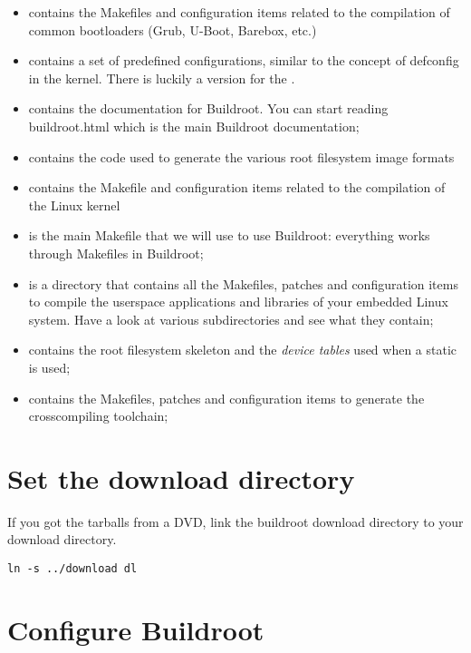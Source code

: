 \begin{itemize}
\item {} contains the Makefiles and configuration items
  related to the compilation of common bootloaders (Grub, U-Boot,
  Barebox, etc.)
\item {} contains a set of predefined configurations,
  similar to the concept of defconfig in the kernel.
  There is luckily a version for the \devboard.
\item {} contains the documentation for Buildroot. You can
  start reading buildroot.html which is the main Buildroot
  documentation;
\item {} contains the code used to generate the various root
  filesystem image formats
\item {} contains the Makefile and configuration items
  related to the compilation of the Linux kernel
\item {} is the main Makefile that we will use to use
  Buildroot: everything works through Makefiles in Buildroot;
\item {} is a directory that contains all the Makefiles,
  patches and configuration items to compile the userspace
  applications and libraries of your embedded Linux system. Have a
  look at various subdirectories and see what they contain;
\item {} contains the root filesystem skeleton and the {\em
    device tables} used when a static  is used;
\item {} contains the Makefiles, patches and
  configuration items to generate the crosscompiling toolchain;
\end{itemize}

\section{Set the download directory}
If you got the tarballs from a DVD, link the buildroot
download directory  to your download directory.

\begin{verbatim}
ln -s ../download dl
\end{verbatim}

\clearpage

\section{Configure Buildroot}

